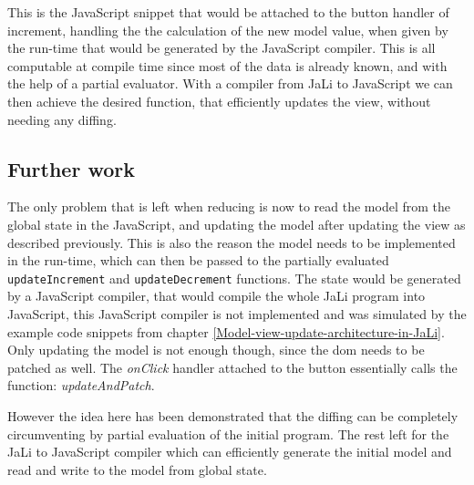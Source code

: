 This is the JavaScript snippet that would be attached to the button handler of increment, handling the the calculation of the new model value, when given by the run-time that would be generated by the JavaScript compiler. This is all computable at compile time since most of the data is already known, and with the help of a partial evaluator. With a compiler from JaLi to JavaScript we can then achieve the desired function, that efficiently updates the view, without needing any diffing.

\subsection{Further work}
The only problem that is left when reducing is now to read the model from the global state in the JavaScript, and updating the model after updating the view as described previously. This is also the reason the model needs to be implemented in the run-time, which can then be passed to the partially evaluated \texttt{updateIncrement} and \texttt{updateDecrement} functions.
The state would be generated by a JavaScript compiler, that would compile the whole JaLi program into JavaScript, this JavaScript compiler is not implemented and was simulated by the example code snippets from chapter \ref{Model-view-update-architecture-in-JaLi}.
Only updating the model is not enough though, since the \gls{dom} needs to be patched as well. The \textit{onClick} handler attached to the button essentially calls the function: \textit{updateAndPatch}.

However the idea here has been demonstrated that the diffing can be completely circumventing by partial evaluation of the initial program. The rest left for the JaLi to JavaScript compiler which can efficiently generate the initial model and read and write to the model from global state.
